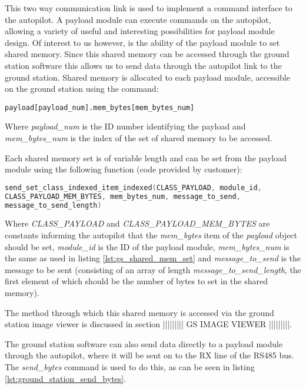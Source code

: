 This two way communication link is used to implement a command interface to 
the autopilot. A payload module can execute commands on the autopilot, 
allowing a variety of useful and interesting possibilities for payload
module design. Of interest to us however, is the ability of the payload
module to set shared memory. Since this shared memory can be accessed 
through the ground station software this allows us to send data through the
autopilot link to the ground station. Shared memory is allocated to 
each payload module, accessible on the ground station using the command:
~\\
\begin{lstlisting}[caption={Accessing shared memory from Ground Station}, label=lst:gs_shared_mem_set]
payload[payload_num].mem_bytes[mem_bytes_num]
\end{lstlisting}

Where \emph{payload\_num} is the ID number identifying the payload and 
\emph{mem\_bytes\_num} is the index of the set of shared memory to be accessed.

Each shared memory set is of variable length and can be set from the payload 
module using the following function (code provided by customer):
~\\
\begin{lstlisting}[language=C, caption={Setting shared memory from Payload}, label=lst:payload_shared_mem_set]
send_set_class_indexed_item_indexed(CLASS_PAYLOAD, module_id, 
CLASS_PAYLOAD_MEM_BYTES, mem_bytes_num, message_to_send,
message_to_send_length)
\end{lstlisting}

Where \emph{CLASS\_PAYLOAD} and \emph{CLASS\_PAYLOAD\_MEM\_BYTES} are constants 
informing the autopilot that the \emph{mem\_bytes} item of the \emph{payload} 
object should be set, \emph{module\_id} is the ID of the payload module,
\emph{mem\_bytes\_num} is the same as used in listing
\ref{lst:gs_shared_mem_set} and \emph{message\_to\_send} is the message to be 
sent (consisting of an array of length \emph{message\_to\_send\_length}, the 
first element of which should be the number of bytes to set in the shared 
memory).

The method through which this shared memory is accessed via the ground station
image viewer is discussed in section ||||||||| GS IMAGE VIEWER |||||||||.

The ground station software can also send data directly to a payload module 
through the autopilot, where it will be sent on to the RX line of the RS485
bus. The \emph{send\_bytes} command is used to do this, as can be seen in 
listing \ref{lst:ground_station_send_bytes}. 

